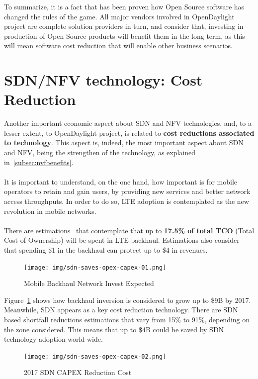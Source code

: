\documentclass[a4paper, 12pt]{book}
\begin{document}
To summarize, it is a fact that has been proven how Open Source software has changed the rules of the game. All major vendors involved in OpenDaylight project are complete solution providers in turn, and consider that, investing in production of Open Source products will benefit them in the long term, as this will mean software cost reduction that will enable other business scenarios.

\section{SDN/NFV technology: Cost Reduction}
\label{sec:sdnnfvcostreduction}
Another important economic aspect about SDN and NFV technologies, and, to a lesser extent, to OpenDaylight project, is related to \textbf{cost reductions associated to technology}. This aspect is, indeed, the most important aspect about SDN and NFV, being the strengthen of the technology, as explained in~\ref{subsec:nvfbenefits}.\\
\\
It is important to understand, on the one hand, how important is for mobile operators to retain and gain users, by providing new services and better network access throughputs. In order to do so, LTE adoption is contemplated as the new revolution in mobile networks.\\
\\
There are estimations~\cite{SDNsaves4B} that contemplate that up to \textbf{17.5\% of total TCO} (Total Cost of Ownership) will be spent in LTE backhaul. Estimations also consider that spending \$1 in the backhaul can protect up to \$4 in revenues.
\begin{center}
 \begin{figure}
 \begin{center}
   \texttt{[image: img/sdn-saves-opex-capex-01.png]}
   \caption{Mobile Backhaul Network Invest Expected}
   \label{fig:LTE Investment}
 \end{center}
 \end{figure}
\end{center}
Figure~\ref{fig:LTE Investment} shows how backhaul inversion is considered to grow up to \$9B by 2017. Meanwhile, SDN appears as a key cost reduction technology. There are SDN based shortfall reductions estimations that vary from 15\% to 91\%, depending on the zone considered. This means that up to \$4B could be saved by SDN technology adoption world-wide.
\begin{center}
 \begin{figure}[H]
 \begin{center}
   \texttt{[image: img/sdn-saves-opex-capex-02.png]}
   \caption{2017 SDN CAPEX Reduction Cost}
   \label{fig:sdncapexreduction}
 \end{center}
 \end{figure}
\end{center}
\end{document}
